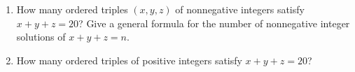 \begin{enumerate}
\item[(a)] How many ordered triples $(x,y,z)$ of nonnegative integers satisfy $x+y+z=20$? Give a general formula for the number of nonnegative integer solutions of $x+y+z=n$.
\item[(b)] How many ordered triples of positive integers satisfy $x+y+z=20$?
\end{enumerate}
